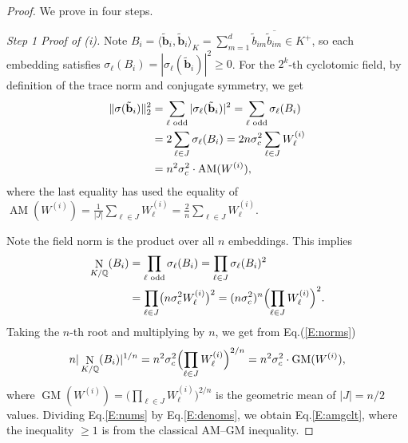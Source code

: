 \documentclass[11pt,a4paper]{article}
\theoremstyle{plain}
\theoremstyle{definition}
\theoremstyle{remark}
\DeclareMathOperator{\Nm}{N}
\newcommand{\Q}{\mathbb{Q}}
\begin{document}
\begin{proof}
We prove in four steps.

\textit{Step 1 Proof of (i).} Note $B_i=\langle\tilde{\mathbf{b}}_i, \tilde{\mathbf{b}}_i\rangle_K =\sum_{m=1}^d\tilde b_{im}\overline{\tilde b_{im}}\in K^+$, so each embedding satisfies $\sigma_\ell(B_i)=|\sigma_\ell(\tilde{\mathbf{b}}_i)|^2\ge0$. For the $2^k$-th cyclotomic field, by definition of the trace norm and conjugate symmetry, we get 
\begin{align}
  \|\sigma(\tilde{\mathbf{b}}_i)\|_2^2
  &=\sum_{\ell\text{ odd}}|\sigma_\ell(\tilde{\mathbf{b}}_i)|^2
   =\sum_{\ell\text{ odd}}\sigma_\ell(B_i)
  \notag\\
  &=2\sum_{\ell\in J}\sigma_\ell(B_i)
   =2 n\sigma_c^2\sum_{\ell\in J}W^{(i)}_\ell
  \notag\\
  & =n^2\sigma_c^2\cdot\operatorname{AM}(W^{(i)}),
  \label{E:nums}
\end{align}
where the last equality has used the equality of $\operatorname{AM}(W^{(i)})=\tfrac{1}{|J|}\sum_{\ell\in J}W^{(i)}_\ell=\tfrac{2}{n}\sum_{\ell\in J}W^{(i)}_\ell$.

Note the field norm is the product over all $n$ embeddings. This implies 
\begin{align}
  \Nm_{K/\Q}(B_i)
  &=\prod_{\ell\text{ odd}}\sigma_\ell(B_i)
   =\prod_{\ell\in J}\sigma_\ell(B_i)^2
  \notag\\
  &=\prod_{\ell\in J}\bigl(n\sigma_c^2  W^{(i)}_\ell\bigr)^2
  =(n\sigma_c^2)^{n} \Bigl(\prod_{\ell\in J}W^{(i)}_\ell\Bigr)^{2}.
  \label{E:norms}
\end{align}
Taking the $n$-th root and multiplying by $n$, we get from Eq.(\ref{E:norms})
\begin{align}
  n|\Nm_{K/\Q}(B_i)|^{1/n}
  =n^2\sigma_c^2\Bigl(\prod_{\ell\in J}W^{(i)}_\ell\Bigr)^{2/n}
  =n^2\sigma_c^2\cdot\operatorname{GM}(W^{(i)}),
  \label{E:denoms}
\end{align}
where $\operatorname{GM}(W^{(i)})
=\bigl(\prod_{\ell\in J}W^{(i)}_\ell\bigr)^{2/n}$ is the geometric mean of $|J|=n/2$ values. Dividing Eq.\eqref{E:nums} by Eq.\eqref{E:denoms}, we obtain Eq.\eqref{E:amgclt}, where the inequality $\ge 1$ is from the classical AM--GM inequality.


\end{proof}
\end{document}
